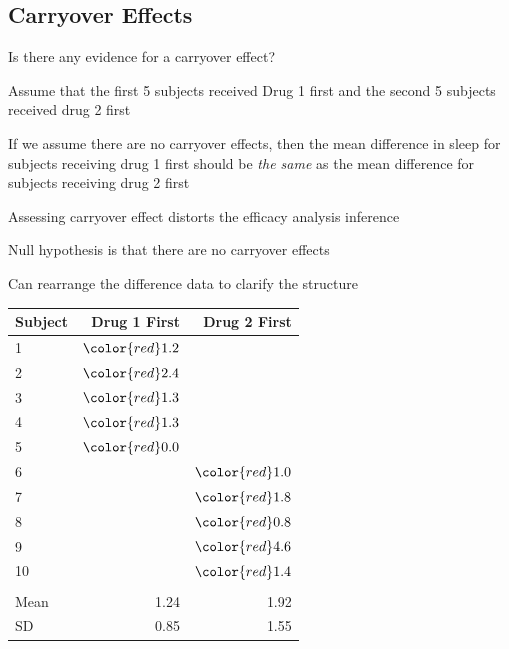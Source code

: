 \subsection{Carryover Effects}

\bi
   \item Is there any evidence for a carryover effect?
   \item Assume that the first 5 subjects received Drug 1 first and the second 5 subjects received drug 2 first
   \item If we assume there are no carryover effects, then the mean difference in sleep for subjects receiving drug 1 first should be \textit{the same} as the mean difference for subjects receiving drug 2 first
   \item Assessing carryover effect distorts the efficacy
     analysis inference
   \item Null hypothesis is that there are no carryover effects
   \item Can rearrange the difference data to clarify the structure
\ei

 \begin{center}
 \begin{tabular}{lrr}\hline\hline
Subject & Drug 1 First & Drug 2 First
\\ \hline
1 & $\color{red}1.2$ & \\
2 & $\color{red}2.4$ & \\
3 & $\color{red}1.3$ & \\
4 & $\color{red}1.3$ & \\
5 & $\color{red}0.0$ & \\
6 & & $\color{red}1.0$\\
7 & & $\color{red}1.8$\\
8 & & $\color{red}0.8$\\
9 & & $\color{red}4.6$\\
10 & & $\color{red}1.4$\\ \\
Mean & 1.24 & 1.92 \\
SD & 0.85 & 1.55 \\
\hline
\end{tabular}
\end{center}

